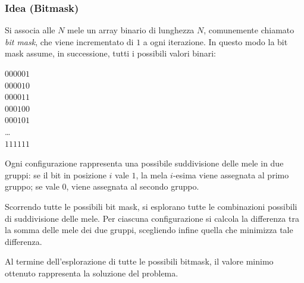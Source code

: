 \subsubsection{Idea (Bitmask)}

Si associa alle \(N\) mele un array binario di lunghezza \(N\), comunemente chiamato \emph{bit mask}, che viene incrementato di \(1\) a ogni iterazione.  
In questo modo la bit mask assume, in successione, tutti i possibili valori binari:

\medskip
\noindent$000001$ \\
$000010$ \\
$000011$ \\
$000100$ \\
$000101$ \\
\dots \\
$111111$
\medskip

Ogni configurazione rappresenta una possibile suddivisione delle mele in due gruppi:  
se il bit in posizione \(i\) vale \(1\), la mela \(i\)-esima viene assegnata al primo gruppo;  
se vale \(0\), viene assegnata al secondo gruppo.

Scorrendo tutte le possibili bit mask, si esplorano tutte le combinazioni possibili di suddivisione delle mele.  
Per ciascuna configurazione si calcola la differenza tra la somma delle mele dei due gruppi, scegliendo infine quella che minimizza tale differenza.

Al termine dell'esplorazione di tutte le possibili bitmask, il valore minimo ottenuto rappresenta la soluzione del problema.

